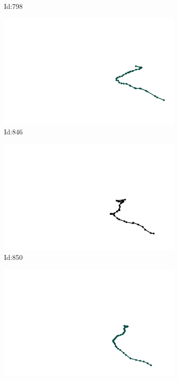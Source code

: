 \documentclass[12pt,twoside]{report}
\begin{document}
\begin{figure}
\begin{subfigure}[b]{0.20\textwidth}
\caption{Id:798}
\end{subfigure}
\begin{subfigure}[b]{0.20\textwidth}
\centering
\includegraphics[width=\textwidth]{../trajectories/846.png}
\caption{Id:846}
\end{subfigure}
\begin{subfigure}[b]{0.20\textwidth}
\centering
\includegraphics[width=\textwidth]{../trajectories/850.png}
\caption{Id:850}
\end{subfigure}
\begin{subfigure}[b]{0.20\textwidth}
\centering
\includegraphics[width=\textwidth]{../trajectories/881.png}

\end{subfigure}
\end{figure}
\end{document}
